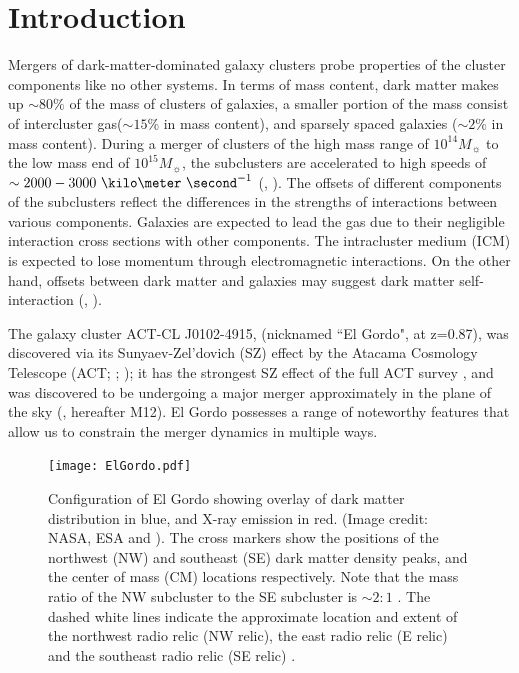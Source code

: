 \documentclass[letterpaper,useAMS,usenatbib]{mn2e}
\begin{document}
\section{Introduction} 
Mergers of dark-matter-dominated galaxy clusters probe properties
of the cluster components like no other systems. 
In terms of mass content, dark matter makes up $\sim80\%$ of the mass of clusters
of galaxies, a smaller portion of the mass consist of intercluster
gas($\sim15\%$ in mass content), and sparsely spaced galaxies ($\sim2\%$ in mass content). During a merger of
clusters of the high mass range of $10^{14} M_{\sun}$ to the low mass end of
$10^{15} M_{\sun}$, the subclusters are accelerated to high speeds of 
$\sim 2000 - 3000~\kilo \meter~\second^{-1}$ (\citealt{Lage2014},
\citealt{Dawson12}). The offsets of
different components of the subclusters reflect the differences in the
strengths of interactions between various components. Galaxies are
expected to lead the gas due to their negligible interaction cross
sections with other components. The intracluster medium (ICM) is expected to lose
momentum through electromagnetic interactions. On the other hand, offsets
between dark matter and galaxies may suggest dark matter self-interaction
(\citealt{Kahlhoefer14}, \citealt{Randall2008d}).  
\par
The galaxy cluster ACT-CL J0102-4915, (nicknamed ``El Gordo", at z=0.87),
was discovered via its Sunyaev-Zel'dovich (SZ) effect by the Atacama Cosmology Telescope (ACT;
\citealt{Menanteau2010}; \citealt{Marriage11}); it has the strongest SZ
effect of the full ACT survey \citep{Hasselfield2013}, and was discovered
to be undergoing a major merger approximately in the plane of the sky
(\citealt{M12}, hereafter M12). El Gordo possesses a range of noteworthy features that allow us to constrain the merger dynamics in multiple ways. 
\begin{figure}
	\texttt{[image: ElGordo.pdf]}
	\caption{Configuration of El Gordo showing overlay of dark
		matter distribution in blue, and X-ray emission in red. 
		(Image credit: NASA, ESA and \citealt{Jee13}). 
		The cross markers show the positions of the northwest (NW) and
		southeast (SE) dark matter density peaks, and the center of mass (CM)
		locations respectively. Note that the mass ratio of the NW subcluster
		to the SE subcluster is $\sim 2:1$ \citep{Jee13}. 
		The dashed white lines indicate the approximate location and extent of the northwest radio relic (NW relic), the east radio relic (E relic) and the
		southeast radio relic (SE relic) \citep{L13}.
		\label{fig:config}
	}
\end{figure}
\end{document}
